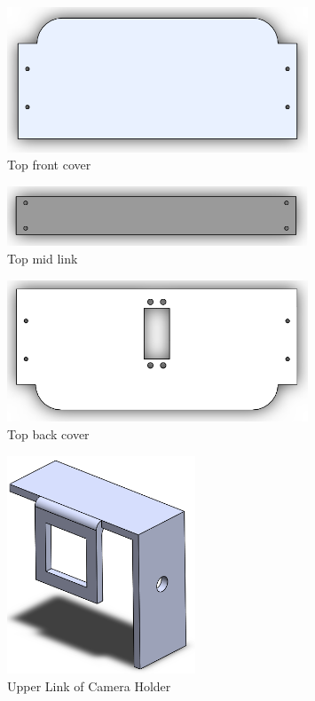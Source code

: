 \documentclass[12pt]{book}
\begin{document}
\begin{figure}
	\centering
	\includegraphics[width =0.8\textwidth]{Fig/solid/top-front-cover.png}
	\caption{Top front cover}
\end{figure}

\begin{figure}
	\centering
	\includegraphics[width =0.8\textwidth]{Fig/solid/mid-part.png}
	\caption{Top mid link}
\end{figure}

\begin{figure}
	\centering
	\includegraphics[width =0.8\textwidth]{Fig/solid/top-back-cover.png}
	\caption{Top back cover}
\end{figure}




\begin{figure}
	\centering
	\includegraphics[width =0.5\textwidth]{Fig/solid/cam-holder-2.png}
	\caption{Upper Link of Camera Holder}
\end{figure}
\end{document}
